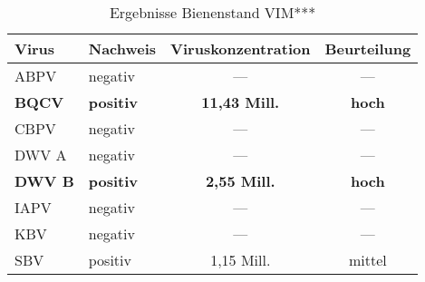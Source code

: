 \begin{table}[htp]
    \caption{Ergebnisse Bienenstand VIM***}
    \centering
    \begin{tabular}{l|l|c|c}
    \toprule
    Virus   & Nachweis &  Viruskonzentration    & Beurteilung \\
    \midrule
    ABPV    &  negativ  &   ---                 & ---\\
    \textbf{BQCV}    &  \textbf{positiv}  &   \textbf{11,43 Mill.}         & \textbf{hoch}\\
    CBPV    &  negativ  &   ---                 & ---\\
    DWV A   &  negativ  &   ---                 & ---\\
    \textbf{DWV B}   &  \textbf{positiv}  &   \textbf{2,55 Mill.}          & \textbf{hoch}\\
    IAPV    &  negativ  &   ---                 & ---\\
    KBV     &  negativ  &   ---                 & ---\\
    SBV     &  positiv  &   1,15 Mill.          & mittel\\
    \bottomrule
    \end{tabular}
    \label{tab:i:bsp_ergebnis}
\end{table}